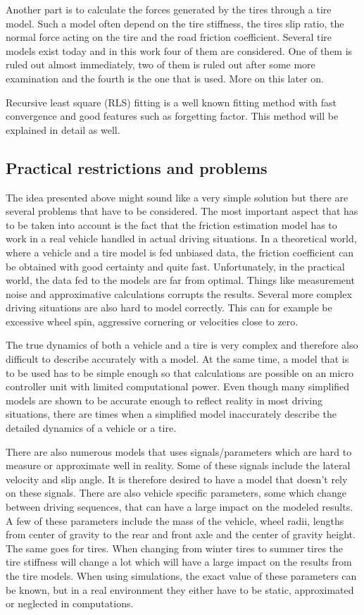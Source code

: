 Another part is to calculate the forces generated by the tires through a tire model. Such a model often depend on the tire stiffness, the tires slip ratio, the normal force acting on the tire and the road friction coefficient. Several tire models exist today and in this work four of them are considered. One of them is ruled out almost immediately, two of them is ruled out after some more examination and the fourth is the one that is used. More on this later on.

Recursive least square (RLS) fitting is a well known fitting method with fast convergence and good features such as forgetting factor. This method will be explained in detail as well.

\subsection{Practical restrictions and problems}
The idea presented above might sound like a very simple solution but there are several problems that have to be considered. The most important aspect that has to be taken into account is the fact that the friction estimation model has to work in a real vehicle handled in actual driving situations. In a theoretical world, where a vehicle and a tire model is fed unbiased data, the friction coefficient can be obtained with good certainty and quite fast. Unfortunately, in the practical world, the data fed to the models are far from optimal. Things like measurement noise and approximative calculations corrupts the results. Several more complex driving situations are also hard to model correctly. This can for example be excessive wheel spin, aggressive cornering or velocities close to zero.

The true dynamics of both a vehicle and a tire is very complex and therefore also difficult to describe accurately with a model. At the same time, a model that is to be used has to be simple enough so that calculations are possible on an micro controller unit with limited computational power. Even though many simplified models are shown to be accurate enough to reflect reality in most driving situations, there are times when a simplified model inaccurately describe the detailed dynamics of a vehicle or a tire. 

There are also numerous models that uses signals/parameters which are hard to measure or approximate well in reality. Some of these signals include the lateral velocity and slip angle. It is therefore desired to have a model that doesn't rely on these signals. There are also vehicle specific parameters, some which change between driving sequences, that can have a large impact on the modeled results. A few of these parameters include the mass of the vehicle, wheel radii, lengths from center of gravity to the rear and front axle and the center of gravity height. The same goes for tires. When changing from winter tires to summer tires the tire stiffness will change a lot which will have a large impact on the results from the tire models. When using simulations, the exact value of these parameters can be known, but in a real environment they either have to be static, approximated or neglected in computations.

